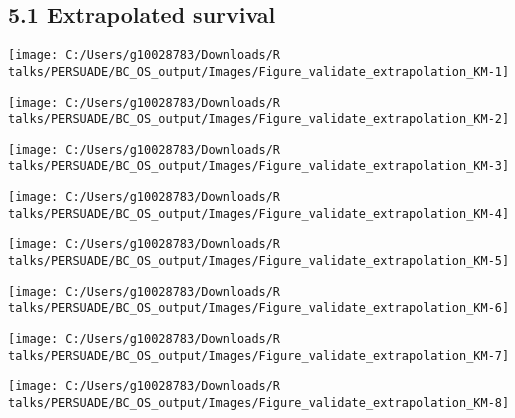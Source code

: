 \documentclass[
]{article}
\begin{document}
\subsection{5.1 Extrapolated survival}\label{extrapolated-survival}

\begin{flushleft}\texttt{[image: C:/Users/g10028783/Downloads/R talks/PERSUADE/BC\_OS\_output/Images/Figure\_validate\_extrapolation\_KM-1]} \end{flushleft}

\begin{flushleft}\texttt{[image: C:/Users/g10028783/Downloads/R talks/PERSUADE/BC\_OS\_output/Images/Figure\_validate\_extrapolation\_KM-2]} \end{flushleft}

\begin{flushleft}\texttt{[image: C:/Users/g10028783/Downloads/R talks/PERSUADE/BC\_OS\_output/Images/Figure\_validate\_extrapolation\_KM-3]} \end{flushleft}

\begin{flushleft}\texttt{[image: C:/Users/g10028783/Downloads/R talks/PERSUADE/BC\_OS\_output/Images/Figure\_validate\_extrapolation\_KM-4]} \end{flushleft}

\begin{flushleft}\texttt{[image: C:/Users/g10028783/Downloads/R talks/PERSUADE/BC\_OS\_output/Images/Figure\_validate\_extrapolation\_KM-5]} \end{flushleft}

\begin{flushleft}\texttt{[image: C:/Users/g10028783/Downloads/R talks/PERSUADE/BC\_OS\_output/Images/Figure\_validate\_extrapolation\_KM-6]} \end{flushleft}

\begin{flushleft}\texttt{[image: C:/Users/g10028783/Downloads/R talks/PERSUADE/BC\_OS\_output/Images/Figure\_validate\_extrapolation\_KM-7]} \end{flushleft}

\begin{flushleft}\texttt{[image: C:/Users/g10028783/Downloads/R talks/PERSUADE/BC\_OS\_output/Images/Figure\_validate\_extrapolation\_KM-8]} \end{flushleft}
\end{document}
